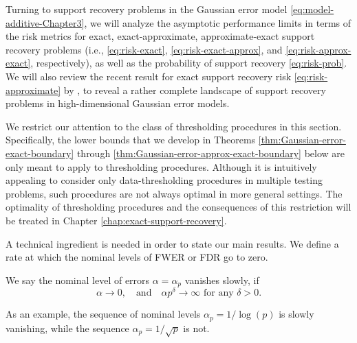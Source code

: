 
Turning to support recovery problems in the Gaussian error model \eqref{eq:model-additive-Chapter3},
we will analyze the asymptotic performance limits in terms of the risk metrics for exact, exact-approximate, approximate-exact support recovery problems (i.e., \eqref{eq:risk-exact}, \eqref{eq:risk-exact-approx}, and \eqref{eq:risk-approx-exact}, respectively), as well as the probability of support recovery \eqref{eq:risk-prob}. 
We will also review the recent result for exact support recovery risk \eqref{eq:risk-approximate} by \cite{arias2017distribution}, to reveal a rather complete landscape of support recovery problems in high-dimensional Gaussian error models.

We restrict our attention to the class of thresholding procedures in this section.
Specifically, the lower bounds that we develop in Theorems \ref{thm:Gaussian-error-exact-boundary} through \ref{thm:Gaussian-error-approx-exact-boundary} below are only meant to apply to thresholding procedures. 
Although it is intuitively appealing to consider only data-thresholding procedures in multiple testing problems, such procedures are not always optimal in more general settings. 
The optimality of thresholding procedures and the consequences of this restriction will be treated in Chapter \ref{chap:exact-support-recovery}.

\medskip

A technical ingredient is needed in order to state our main results.
We define a rate at which the nominal levels of FWER or FDR go to zero.
\begin{definition} \label{def:slowly-vanishing}
We say the nominal level of errors $\alpha = \alpha_p$ vanishes slowly, if
\begin{equation} \label{eq:slowly-vanishing-error}
    \alpha\to 0,\quad \text{and} \quad \alpha p^\delta\to\infty \text{  for any } \delta>0.
\end{equation}
\end{definition}
As an example, the sequence of nominal levels $\alpha_p = 1/\log{(p)}$ is slowly vanishing, while the sequence $\alpha_p = 1/\sqrt{p}$ is not.


